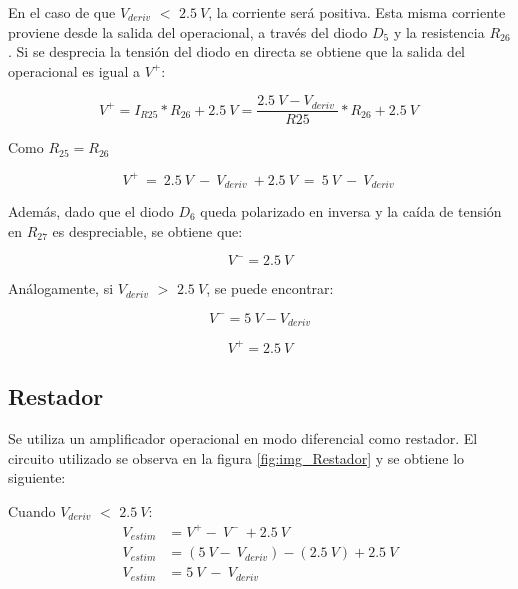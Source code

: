 En el caso de que $V_{deriv}$ $\mathrm{<}$ $2.5\:V$, la corriente será positiva. Esta misma corriente proviene desde la salida del operacional, a través del diodo $D_5$ y la resistencia $R_{26}$. Si se desprecia la tensión del diodo en directa se obtiene que la salida del operacional es igual a $V^+$:

\begin{equation} \label{eq_V+}
	V^+=I_{R25}*R_{26}+2.5\:V=\frac{2.5\:V-V_{deriv}\ }{R25}*R_{26}+2.5\:V\ 
\end{equation} 

Como $R_{25}=R_{26}$

\begin{equation} \label{eq_V+_2}
	V^+\ =\ 2.5\:V\ -\ V_{deriv}\ +2.5\:V\ =\ 5\:V\ -\ V_{deriv}\ 
\end{equation}

Además, dado que el diodo $D_6$ queda polarizado en inversa y la caída de tensión en $R_{27}$ es despreciable, se obtiene que:
 
 \begin{equation} 
 	V^- = 2.5\:V 
 \end{equation}

Análogamente, si $V_{deriv}$ $\mathrm{>}$ $2.5\:V$, se puede encontrar:

\begin{equation} \label{eq_V+_3}
	V^- =5\:V-V_{deriv} 
\end{equation}

\begin{equation} 
	V^+ = 2.5\:V
\end{equation}


\subsection{Restador}

Se utiliza un amplificador operacional en modo diferencial como restador. El circuito utilizado se observa en la figura \ref{fig:img_Restador} y se obtiene lo siguiente:

Cuando $V_{deriv}$ $\mathrm{<}$ $2.5\:V$:
\begin{equation*} 
	\begin{aligned}
		V_{estim}&=V^+-\ V^-\ +2.5\:V\\ 
		V_{estim}&=(5\:V -\ V_{deriv})-(2.5\: V)+2.5\:V\\
		V_{estim}&=5\: V\ -\ V_{deriv}\\ 
	\end{aligned}
\end{equation*}


